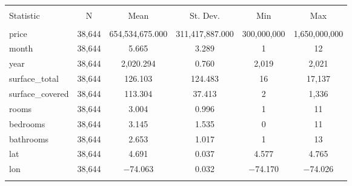 
\begin{table}[!htbp] \centering 
  \caption{} 
  \label{} 
\begin{tabular}{@{\extracolsep{5pt}}lccccc} 
\\[-1.8ex]\hline 
\hline \\[-1.8ex] 
Statistic & \multicolumn{1}{c}{N} & \multicolumn{1}{c}{Mean} & \multicolumn{1}{c}{St. Dev.} & \multicolumn{1}{c}{Min} & \multicolumn{1}{c}{Max} \\ 
\hline \\[-1.8ex] 
price & 38,644 & 654,534,675.000 & 311,417,887.000 & 300,000,000 & 1,650,000,000 \\ 
month & 38,644 & 5.665 & 3.289 & 1 & 12 \\ 
year & 38,644 & 2,020.294 & 0.760 & 2,019 & 2,021 \\ 
surface\_total & 38,644 & 126.103 & 124.483 & 16 & 17,137 \\ 
surface\_covered & 38,644 & 113.304 & 37.413 & 2 & 1,336 \\ 
rooms & 38,644 & 3.004 & 0.996 & 1 & 11 \\ 
bedrooms & 38,644 & 3.145 & 1.535 & 0 & 11 \\ 
bathrooms & 38,644 & 2.653 & 1.017 & 1 & 13 \\ 
lat & 38,644 & 4.691 & 0.037 & 4.577 & 4.765 \\ 
lon & 38,644 & $-$74.063 & 0.032 & $-$74.170 & $-$74.026 \\ 
\hline \\[-1.8ex] 
\end{tabular} 
\end{table} 
